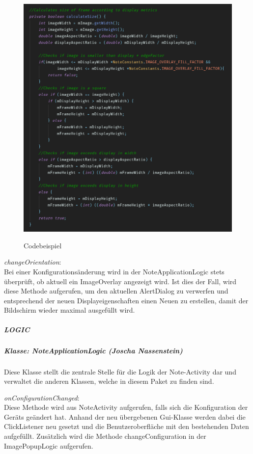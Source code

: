 \begin{figure}[H]
\centering
\begin{minipage}[t]{1\textwidth} %
\caption{Codebeispiel} %
\includegraphics[width=1 \textwidth]{img/note_imageOverlayCodeExample}\\ %
\end{minipage}
\end{figure}

\textit{changeOrientation}:\\
Bei einer Konfigurationsänderung wird in der NoteApplicationLogic stets überprüft, ob aktuell ein ImageOverlay angezeigt wird. Ist dies der Fall, wird diese Methode aufgerufen, um den aktuellen AlertDialog zu verwerfen und entsprechend der neuen Displayeigenschaften einen Neuen zu erstellen, damit der Bildschirm wieder maximal ausgefüllt wird.

\subparagraph{LOGIC}
\subparagraph*{Klasse: NoteApplicationLogic (Joscha Nassenstein)}
Diese Klasse stellt die zentrale Stelle für die Logik der Note-Activity dar und verwaltet die anderen Klassen, welche in diesem Paket zu finden sind.

\textit{onConfigurationChanged}:\\
Diese Methode wird aus NoteActivity aufgerufen, falls sich die Konfiguration der Geräts geändert hat. Anhand der neu übergebenen Gui-Klasse werden dabei die ClickListener neu gesetzt und die Benutzeroberfläche mit den bestehenden Daten aufgefüllt. Zusätzlich wird die Methode changeConfiguration in der ImagePopupLogic aufgerufen.

